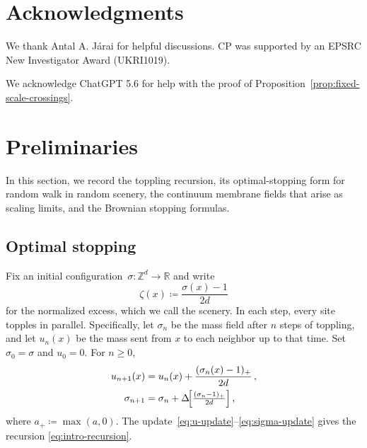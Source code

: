 \documentclass[11pt]{amsart}
\theoremstyle{plain}
\theoremstyle{definition}
\newcommand{\Z}{\mathbb{Z}}
\newcommand{\R}{\mathbb{R}}
\begin{document}
\section*{Acknowledgments}
We thank Antal A. J\'arai for helpful discussions. CP was supported by an EPSRC New Investigator Award (UKRI1019).

We acknowledge ChatGPT 5.6 for help with the proof of Proposition~\ref{prop:fixed-scale-crossings}.



\section{Preliminaries}\label{sec:rw-rep}

	In this section, we record the toppling recursion, its
	optimal-stopping form for random walk in random scenery, the continuum
	membrane fields that arise as scaling limits, and the Brownian stopping
	formulas.


		\subsection{Optimal stopping}
		Fix an initial configuration~$\sigma:\Z^d \to \R$ and write
		\begin{equation}\label{eq:mass-excess-notation}
			\zeta(x)\coloneqq\frac{\sigma(x)-1}{2d}
		\end{equation}
		for the normalized excess, which we call the scenery. In each step, every site topples in parallel.
		Specifically, let $\sigma_n$ be the mass field after $n$ steps of toppling, and
		let $u_n(x)$ be the mass sent from $x$ to each neighbor up to that time. Set
		$\sigma_0=\sigma$ and $u_0=0$. For $n\geq0$,
		\begin{align}
	u_{n+1}(x)&=u_n(x)+\frac{(\sigma_n(x)-1)_+}{2d}\, ,\label{eq:u-update}\\
	\sigma_{n+1}&=\sigma_n+\Delta\!\Bigl[\tfrac{(\sigma_n-1)_+}{2d}\Bigr]\, ,\label{eq:sigma-update}
	\end{align}
	where $a_+\coloneqq\max(a,0)$. The update~\eqref{eq:u-update}--\eqref{eq:sigma-update} gives the recursion
		\eqref{eq:intro-recursion}.
\end{document}
